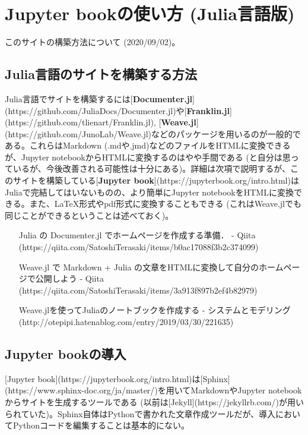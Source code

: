 \section{Jupyter bookの使い方 (Julia言語版)
}
このサイトの構築方法について (2020/09/02)。



\subsection{Julia言語のサイトを構築する方法
}
Julia言語でサイトを構築するには[\textbf{Documenter.jl}](https://github.com/JuliaDocs/Documenter.jl)や[\textbf{Franklin.jl}](https://github.com/tlienart/Franklin.jl), [\textbf{Weave.jl}](https://github.com/JunoLab/Weave.jl)などのパッケージを用いるのが一般的である。これらはMarkdown (.mdや.jmd)などのファイルをHTMLに変換できるが、Jupyter notebookからHTMLに変換するのはやや手間である (と自分は思っているが、今後改善される可能性は十分にある)。詳細は次項で説明するが、このサイトを構築している[\textbf{Jupyter book}](https://jupyterbook.org/intro.html)はJuliaで完結してはいないものの、より簡単にJupyter notebookをHTMLに変換できる。また、LaTeX形式やpdf形式に変換することもできる (これはWeave.jlでも同じことができるということは述べておく)。



\begin{itemize}
\item [Julia の Documenter.jl でホームページを作成する準備． - Qiita](https://qiita.com/SatoshiTerasaki/items/b0ac17088f3b2c374099)

\item [Weave.jl で Markdown + Julia の文章をHTMLに変換して自分のホームページで公開しよう - Qiita](https://qiita.com/SatoshiTerasaki/items/3a913f897b2ef4b82979)

\item [Weave.jlを使ってJuliaのノートブックを作成する - システムとモデリング](http://otepipi.hatenablog.com/entry/2019/03/30/221635)

\end{itemize}


\subsection{Jupyter bookの導入
}
[Jupyter book](https://jupyterbook.org/intro.html)は[Sphinx](https://www.sphinx-doc.org/ja/master/)を用いてMarkdownやJupyter notebookからサイトを生成するツールである (以前は[Jekyll](https://jekyllrb.com/)が用いられていた)。Sphinx自体はPythonで書かれた文章作成ツールだが、導入においてPythonコードを編集することは基本的にない。



